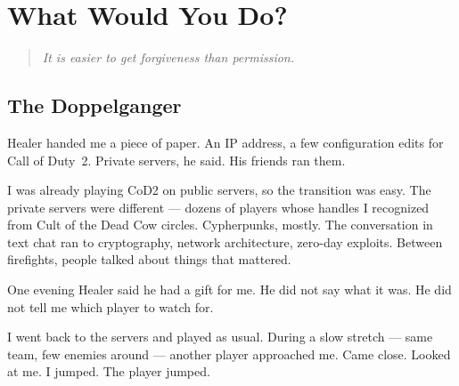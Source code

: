
\chapter{What Would You Do?}
\label{record:the-question}

\begin{quote}\small\textit{%
It is easier to get forgiveness than permission.%
}\end{quote}

\vspace{0.5cm}


\section*{The Doppelganger}
\label{record:tq-the-doppelganger}


\noindent Healer handed me a piece of paper. An IP address, a few configuration edits for Call of Duty~2. Private servers, he said. His friends ran them.

I was already playing CoD2 on public servers, so the transition was easy. The private servers were different --- dozens of players whose handles I recognized from Cult of the Dead Cow circles. Cypherpunks, mostly. The conversation in text chat ran to cryptography, network architecture, zero-day exploits. Between firefights, people talked about things that mattered.

One evening Healer said he had a gift for me. He did not say what it was. He did not tell me which player to watch for.

I went back to the servers and played as usual. During a slow stretch --- same team, few enemies around --- another player approached me. Came close. Looked at me. I jumped. The player jumped.

